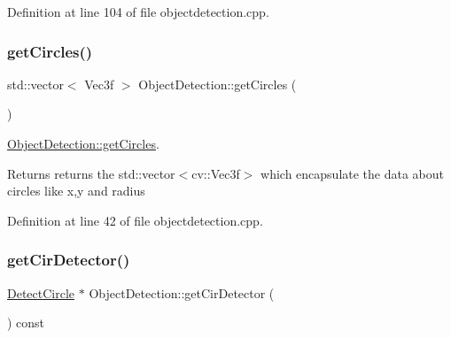 Definition at line 104 of file objectdetection.\+cpp.

\mbox{\label{class_image_processor_1_1_object_detection_aa0f939d2dcf5ec755be433db03fafda6}} 
\subsubsection{\texorpdfstring{get\+Circles()}{getCircles()}}
{\footnotesize\ttfamily std\+::vector$<$ Vec3f $>$ Object\+Detection\+::get\+Circles (\begin{DoxyParamCaption}{ }\end{DoxyParamCaption})}



\hyperlink{class_image_processor_1_1_object_detection_aa0f939d2dcf5ec755be433db03fafda6}{Object\+Detection\+::get\+Circles}. 

\begin{DoxyReturn}{Returns}
returns the std\+::vector$<$cv\+::\+Vec3f$>$ which encapsulate the data about circles like x,y and radius 
\end{DoxyReturn}


Definition at line 42 of file objectdetection.\+cpp.

\mbox{\label{class_image_processor_1_1_object_detection_a8a9535796772b425c44fd5a318adbe5f}} 
\subsubsection{\texorpdfstring{get\+Cir\+Detector()}{getCirDetector()}}
{\footnotesize\ttfamily \hyperlink{class_image_processor_1_1_detect_circle}{Detect\+Circle} $\ast$ Object\+Detection\+::get\+Cir\+Detector (\begin{DoxyParamCaption}{ }\end{DoxyParamCaption}) const}




